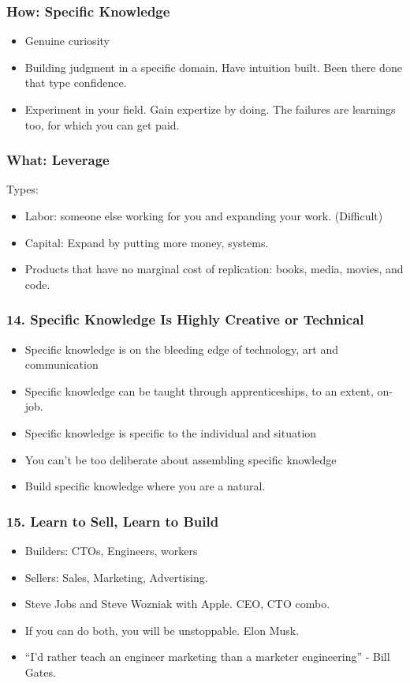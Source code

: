 \begin{frame}[fragile]
\frametitle{How: Specific Knowledge}
\begin{itemize}
\item Genuine curiosity
\item Building judgment in a specific domain. Have intuition built. Been there done that type confidence.
\item Experiment in your field. Gain expertize by doing. The failures are learnings too, for which you can get paid.
\end{itemize}
\end{frame}

\begin{frame}[fragile]
\frametitle{What: Leverage}
Types:
\begin{itemize}
\item Labor: someone else working for you and expanding your work. (Difficult)
\item Capital: Expand by putting more money, systems.
\item Products that have no marginal cost of replication: books, media, movies, and code.
\end{itemize}
\end{frame}


\begin{frame}[fragile]
\frametitle{14. Specific Knowledge Is Highly Creative or Technical}
\begin{itemize}
\item Specific knowledge is on the bleeding edge of technology, art and communication
\item Specific knowledge can be taught through apprenticeships, to an extent, on-job.
\item Specific knowledge is specific to the individual and situation
\item You can't be too deliberate about assembling specific knowledge
\item Build specific knowledge where you are a natural.
\end{itemize}
\end{frame}


\begin{frame}[fragile]
\frametitle{15. Learn to Sell, Learn to Build}
\begin{itemize}
\item Builders: CTOs, Engineers, workers
\item Sellers: Sales, Marketing, Advertising.
\item Steve Jobs and Steve Wozniak with Apple. CEO, CTO combo.
\item If you can do both, you will be unstoppable. Elon Musk.
\item ``I'd rather teach an engineer marketing than a marketer engineering'' - Bill Gates.
\end{itemize}
\end{frame}

